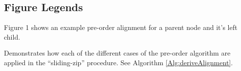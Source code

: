 \documentclass{bmcart}
\begin{document}
\begin{backmatter}
	
	
	
	
	
	
	
	\section*{Figure Legends}
	
	Figure 1 shows an example pre-order alignment for a parent node and it's left child.
    
    Demonstrates how each of the different cases of the pre-order algorithm are applied in the ``sliding-zip'' procedure. See Algorithm \ref{Alg:deriveAlignment}.
	

\end{backmatter}
\end{document}
